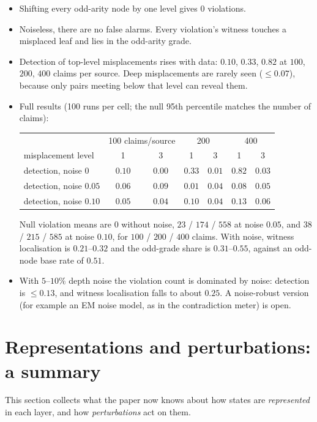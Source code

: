 \documentclass[11pt]{article}
\theoremstyle{definition}
\theoremstyle{remark}
\begin{document}
\begin{itemize}
  \item Shifting every odd-arity node by one level gives $0$ violations.
  \item Noiseless, there are no false alarms. Every violation's witness touches a misplaced leaf and lies in the odd-arity grade.
  \item Detection of top-level misplacements rises with data: $0.10$, $0.33$, $0.82$ at $100$, $200$, $400$ claims per source. Deep misplacements are rarely seen ($\le0.07$), because only pairs meeting below that level can reveal them.
  \item Full results (100 runs per cell; the null 95th percentile matches the number of claims):
  \begin{center}\small
  \begin{tabular}{lcccccc}
  \toprule
  & \multicolumn{2}{c}{100 claims/source} & \multicolumn{2}{c}{200} & \multicolumn{2}{c}{400}\\
  misplacement level & 1 & 3 & 1 & 3 & 1 & 3\\
  \midrule
  detection, noise $0$ & $0.10$ & $0.00$ & $0.33$ & $0.01$ & $0.82$ & $0.03$\\
  detection, noise $0.05$ & $0.06$ & $0.09$ & $0.01$ & $0.04$ & $0.08$ & $0.05$\\
  detection, noise $0.10$ & $0.05$ & $0.04$ & $0.10$ & $0.04$ & $0.13$ & $0.06$\\
  \bottomrule
  \end{tabular}
  \end{center}
  Null violation means are $0$ without noise, $23$ / $174$ / $558$ at noise $0.05$, and $38$ / $215$ / $585$ at noise $0.10$, for $100$ / $200$ / $400$ claims. With noise, witness localisation is $0.21$--$0.32$ and the odd-grade share is $0.31$--$0.55$, against an odd-node base rate of $0.51$.
  \item With $5$--$10\%$ depth noise the violation count is dominated by noise: detection is $\le0.13$, and witness localisation falls to about $0.25$. A noise-robust version (for example an EM noise model, as in the contradiction meter) is open.
\end{itemize}

\section{Representations and perturbations: a summary}\label{sec:reppert}
This section collects what the paper now knows about how states are \emph{represented} in each layer, and how \emph{perturbations} act on them.
\end{document}

